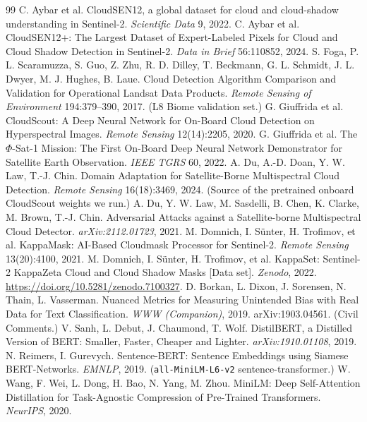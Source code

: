\documentclass[conference]{IEEEtran}
\begin{document}
\begin{thebibliography}{99}
 C. Aybar et al. CloudSEN12, a global dataset for cloud and cloud-shadow understanding in Sentinel-2.
  \emph{Scientific Data} 9, 2022.
 C. Aybar et al. CloudSEN12+: The Largest Dataset of Expert-Labeled Pixels for Cloud and
  Cloud Shadow Detection in Sentinel-2. \emph{Data in Brief} 56:110852, 2024.
 S. Foga, P. L. Scaramuzza, S. Guo, Z. Zhu, R. D. Dilley, T. Beckmann, G. L. Schmidt,
  J. L. Dwyer, M. J. Hughes, B. Laue. Cloud Detection Algorithm Comparison and Validation for Operational
  Landsat Data Products. \emph{Remote Sensing of Environment} 194:379--390, 2017. (L8 Biome validation set.)
 G. Giuffrida et al. CloudScout: A Deep Neural Network for On-Board Cloud Detection on Hyperspectral
  Images. \emph{Remote Sensing} 12(14):2205, 2020.
 G. Giuffrida et al. The $\Phi$-Sat-1 Mission: The First On-Board Deep Neural Network Demonstrator for
  Satellite Earth Observation. \emph{IEEE TGRS} 60, 2022.
 A. Du, A.-D. Doan, Y. W. Law, T.-J. Chin. Domain Adaptation for Satellite-Borne Multispectral Cloud
  Detection. \emph{Remote Sensing} 16(18):3469, 2024. (Source of the pretrained onboard CloudScout weights we run.)
 A. Du, Y. W. Law, M. Sasdelli, B. Chen, K. Clarke, M. Brown, T.-J. Chin. Adversarial Attacks
  against a Satellite-borne Multispectral Cloud Detector. \emph{arXiv:2112.01723}, 2021.
 M. Domnich, I. Sünter, H. Trofimov, et al. KappaMask: AI-Based Cloudmask Processor for Sentinel-2.
  \emph{Remote Sensing} 13(20):4100, 2021.
 M. Domnich, I. Sünter, H. Trofimov, et al. KappaSet: Sentinel-2 KappaZeta Cloud and Cloud
  Shadow Masks [Data set]. \emph{Zenodo}, 2022. \url{https://doi.org/10.5281/zenodo.7100327}.
 D. Borkan, L. Dixon, J. Sorensen, N. Thain, L. Vasserman. Nuanced Metrics for Measuring Unintended Bias
  with Real Data for Text Classification. \emph{WWW (Companion)}, 2019. arXiv:1903.04561. (Civil Comments.)
 V. Sanh, L. Debut, J. Chaumond, T. Wolf. DistilBERT, a Distilled Version of BERT: Smaller, Faster, Cheaper
  and Lighter. \emph{arXiv:1910.01108}, 2019.
 N. Reimers, I. Gurevych. Sentence-BERT: Sentence Embeddings using Siamese BERT-Networks. \emph{EMNLP},
  2019. (\texttt{all-MiniLM-L6-v2} sentence-transformer.)
 W. Wang, F. Wei, L. Dong, H. Bao, N. Yang, M. Zhou. MiniLM: Deep Self-Attention Distillation for
  Task-Agnostic Compression of Pre-Trained Transformers. \emph{NeurIPS}, 2020.

\end{thebibliography}
\end{document}
